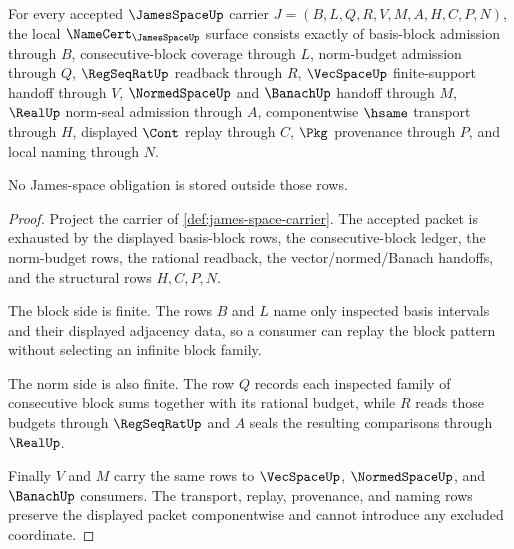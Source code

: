 \begin{theorem}
\label{thm:james-space-namecert-obligations}
For every accepted $\JamesSpaceUp$ carrier $J=(B,L,Q,R,V,M,A,H,C,P,N)$, the local $\NameCert_{\JamesSpaceUp}$ surface consists exactly of basis-block admission through $B$, consecutive-block coverage through $L$, norm-budget admission through $Q$, $\RegSeqRatUp$ readback through $R$, $\VecSpaceUp$ finite-support handoff through $V$, $\NormedSpaceUp$ and $\BanachUp$ handoff through $M$, $\RealUp$ norm-seal admission through $A$, componentwise $\hsame$ transport through $H$, displayed $\Cont$ replay through $C$, $\Pkg$ provenance through $P$, and local naming through $N$.

No James-space obligation is stored outside those rows.
\end{theorem}
\begin{proof}
Project the carrier of \autoref{def:james-space-carrier}. The accepted packet is exhausted by the displayed basis-block rows, the consecutive-block ledger, the norm-budget rows, the rational readback, the vector/normed/Banach handoffs, and the structural rows $H,C,P,N$.

The block side is finite. The rows $B$ and $L$ name only inspected basis intervals and their displayed adjacency data, so a consumer can replay the block pattern without selecting an infinite block family.

The norm side is also finite. The row $Q$ records each inspected family of consecutive block sums together with its rational budget, while $R$ reads those budgets through $\RegSeqRatUp$ and $A$ seals the resulting comparisons through $\RealUp$.

Finally $V$ and $M$ carry the same rows to $\VecSpaceUp$, $\NormedSpaceUp$, and $\BanachUp$ consumers. The transport, replay, provenance, and naming rows preserve the displayed packet componentwise and cannot introduce any excluded coordinate.
\end{proof}

